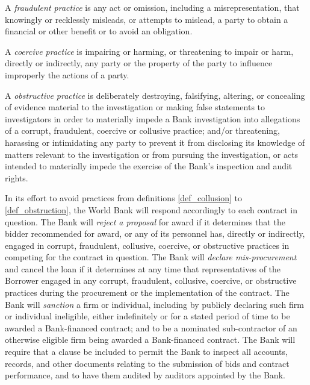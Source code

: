 \begin{definition}\label{def_fraud}
A \textit{fraudulent practice} is any act or omission, including a misrepresentation, that knowingly or recklessly misleads, or attempts to mislead, a party to obtain a financial or other benefit or to avoid an obligation.
\end{definition}

\begin{definition}\label{def_coersion}
A \textit{coercive practice} is impairing or harming, or threatening to impair or harm, directly or indirectly, any party or the property of the party to influence improperly the actions of a party.
\end{definition}

\begin{definition}\label{def_obstruction}
A \textit{obstructive practice} is deliberately destroying, falsifying, altering, or concealing of evidence material to the investigation or making false statements to investigators in order to materially impede a Bank investigation into allegations of a corrupt, fraudulent, coercive or collusive practice; and/or threatening, harassing or intimidating any party to prevent it from disclosing its knowledge of matters relevant to the investigation or from pursuing the investigation, or acts intended to materially impede the exercise of the Bank's inspection and audit rights.
\end{definition}

In its effort to avoid practices from definitions \ref{def_collusion} to \ref{def_obstruction}, the World Bank
will respond accordingly to each contract in question. 
The Bank will \textit{reject a proposal} for award if it determines that the bidder recommended for award, or any of its personnel has, directly or indirectly, engaged in corrupt, fraudulent, collusive, coercive, or obstructive practices in competing for the contract in question. 
The Bank will \textit{declare mis-procurement} and cancel the loan if it determines at any time that representatives of the Borrower engaged in  any corrupt, fraudulent, collusive, coercive, or obstructive practices during the procurement or the implementation of the contract. 
The Bank will \textit{sanction} a firm or individual, including by publicly declaring such firm or individual ineligible, either indefinitely or for a stated period of time to be awarded a Bank-financed contract; and to be a nominated sub-contractor of an otherwise eligible firm being awarded a Bank-financed contract.
The Bank will require that a clause be included to permit the Bank to inspect all accounts, records, and other documents relating to the submission of bids and contract performance, and to have them audited by auditors appointed by the Bank.

